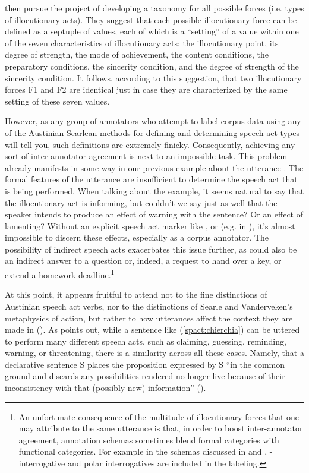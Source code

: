 \textcite{searlevanderveken1985} then pursue the project of developing a taxonomy for all possible forces (i.e. types of illocutionary acts). They suggest that each possible illocutionary force can be defined as a septuple of values, each of which is a “setting” of a value within one of the seven characteristics of illocutionary acts: the illocutionary point, its degree of strength, the mode of achievement, the content conditions, the preparatory conditions, the sincerity condition, and the degree of strength of the sincerity condition. It follows, according to this suggestion, that two illocutionary forces F1 and F2 are identical just in case they are characterized by the same setting of these seven values.

However, as any group of annotators who attempt to label corpus data using any of the Austinian-Searlean methods for defining and determining speech act types will tell you, such definitions are extremely finicky. Consequently, achieving any sort of inter-annotator agreement is next to an impossible task. This problem already manifests in some way in our previous example about the utterance . The formal features of the utterance are insufficient to determine the speech act that is being performed. When talking about the example, it seems natural to say that the illocutionary act is informing, but couldn’t we say just as well that the speaker intends to produce an effect of warning with the sentence? Or an effect of lamenting? Without an explicit speech act marker like ,  or  (e.g. in ), it’s almost impossible to discern these effects, especially as a corpus annotator. The possibility of indirect speech acts exacerbates this issue further, as  could also be an indirect answer to a question or, indeed, a request to hand over a key, or extend a homework deadline.\footnote{An unfortunate consequence of the multitude of illocutionary forces that one may attribute to the same utterance is that, in order to boost inter-annotator agreement, annotation schemas sometimes blend formal categories with functional categories. For example in the schemas discussed in \textcite{ninio1994} and \textcite{dialogact}, \twh-interrogative and polar interrogatives are included in the labeling.}

At this point, it appears fruitful to attend not to the fine distinctions of Austinian speech act verbs, nor to the distinctions of Searle and Vanderveken’s metaphysics of action, but rather to how utterances affect the context they are made in (\cite{hamblin1971, stalnaker1978, lewis1979scorekeeping, gazdar1981speech}). As \textcite{chierchia1990textbook} points out, while a sentence like (\ref{spact:chierchia}) can be uttered to perform many different speech acts, such as claiming, guessing, reminding, warning, or threatening, there is a similarity across all these cases. Namely, that a declarative sentence S places the proposition expressed by S “in the common ground and discards any possibilities rendered no longer live because of their inconsistency with that (possibly new) information” (\cite[p.171]{ chierchia1990textbook}). 

